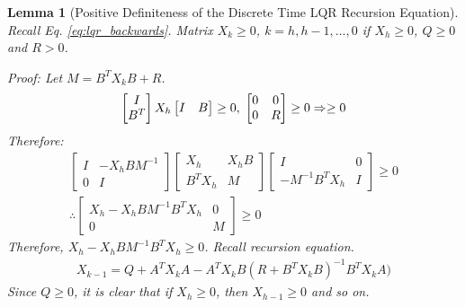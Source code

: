 \documentclass[a4paper]{book}
\newtheorem{lemma}[theorem]{Lemma}
\begin{document}
\begin{lemma}[Positive Definiteness of the Discrete Time LQR Recursion Equation]
	Recall Eq. \ref{eq:lqr_backwards}. Matrix $X_k \geq 0$, $k = h, h-1, \ldots, 0$ if $X_h \geq 0$, $Q \geq 0$ and $R > 0$. 
	
	Proof: Let $M = B^T X_k B + R$. 
	\begin{align*}
	\begin{bmatrix}
	I \\ B^T
	\end{bmatrix} X_h \begin{bmatrix}
	I & B
	\end{bmatrix} \geq 0, \hspace{0.1cm}
	\begin{bmatrix}
	0 & 0 \\ 0 & R
	\end{bmatrix} \geq 0 \Rightarrow  \geq 0
	\end{align*}
	Therefore:
	\begin{align*}
	 \begin{bmatrix}
	I & -X_h BM^{-1} \\ 0 & I
	\end{bmatrix}
	\begin{bmatrix}
	X_h & X_h B \\ B^T X_h & M
	\end{bmatrix} \begin{bmatrix}
	I & 0 \\ -M^{-1} B^T X_h & I
	\end{bmatrix} \geq 0  \\
	\therefore \begin{bmatrix}
	X_h - X_h B M^{-1} B^T X_h & 0 \\ 0 & M
	\end{bmatrix} \geq 0
	\end{align*}
	Therefore, $X_h - X_h B M^{-1} B^T X_h \geq 0$. Recall recursion equation.
	\begin{align}
	X_{k-1} = Q + A^{T}X_k A - A^{T}X_k B(R + B^T X_k B)^{-1} B^T X_k A)
	\end{align}
	Since $Q \geq 0$, it is clear that if $X_h \geq 0$, then $X_{h-1} \geq 0$ and so on. 
\end{lemma}                             
\end{document}
